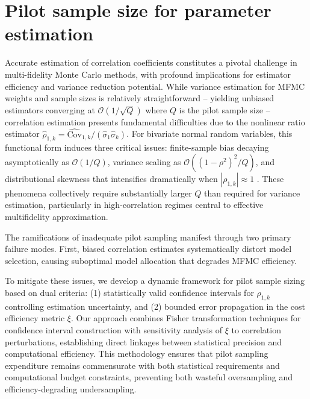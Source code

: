 \section{Pilot sample size for parameter estimation}\label{sec:Parameter_Estimation}
Accurate estimation of correlation coefficients constitutes a pivotal challenge in multi-fidelity Monte Carlo methods, with profound implications for estimator efficiency and variance reduction potential. While variance estimation for MFMC weights and sample sizes is relatively straightforward -- yielding unbiased estimators converging at $\mathcal{O}(1/\sqrt{Q})$ where $Q$ is the pilot sample size -- correlation estimation presents fundamental difficulties due to the nonlinear ratio estimator $\widehat{\rho}_{1,k} = \widehat{\text{Cov}}_{1,k}/(\widehat{\sigma}_1\widehat{\sigma}_k)$. For bivariate normal random variables, this functional form induces three critical issues: finite-sample bias decaying asymptotically as $\mathcal{O}(1/Q)$, variance scaling as $\mathcal{O}((1-\rho^2)^2/Q)$, and distributional skewness that intensifies dramatically when $|\rho_{1,k}|\approx 1$ \cite{Fi:1915,Ha:2007,Ri:1932,So:1913}. These phenomena collectively require substantially larger $Q$ than required for variance estimation, particularly in high-correlation regimes central to effective multifidelity approximation.


The ramifications of inadequate pilot sampling manifest through two primary failure modes. First, biased correlation estimates systematically distort model selection, causing suboptimal model allocation that degrades MFMC efficiency. 


To mitigate these issues, we develop a dynamic framework for pilot sample sizing based on dual criteria: (1) statistically valid confidence intervals for $\rho_{1,k}$ controlling estimation uncertainty, and (2) bounded error propagation in the cost efficiency metric $\xi$. Our approach combines Fisher transformation techniques for confidence interval construction with sensitivity analysis of $\xi$ to correlation perturbations, establishing direct linkages between statistical precision and computational efficiency. This methodology ensures that pilot sampling expenditure remains commensurate with both statistical requirements and computational budget constraints, preventing both wasteful oversampling and efficiency-degrading undersampling.


